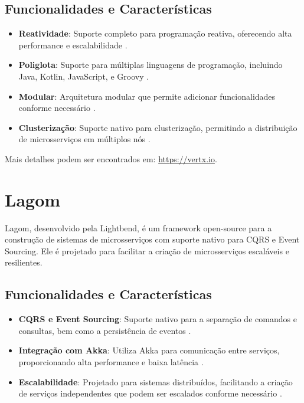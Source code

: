\subsection{Funcionalidades e Características}
\begin{itemize}
    \item \textbf{Reatividade}: Suporte completo para programação reativa, oferecendo alta performance e escalabilidade \cite{Vertx2021}.
    \item \textbf{Poliglota}: Suporte para múltiplas linguagens de programação, incluindo Java, Kotlin, JavaScript, e Groovy \cite{Vertx2021}.
    \item \textbf{Modular}: Arquitetura modular que permite adicionar funcionalidades conforme necessário \cite{Vertx2021}.
    \item \textbf{Clusterização}: Suporte nativo para clusterização, permitindo a distribuição de microsserviços em múltiplos nós \cite{Vertx2021}.
\end{itemize}

Mais detalhes podem ser encontrados em:  \url{https://vertx.io}.


\section{Lagom}
Lagom, desenvolvido pela Lightbend, é um framework open-source para a construção de sistemas de microsserviços com suporte nativo para CQRS e Event Sourcing. Ele é projetado para facilitar a criação de microsserviços escaláveis e resilientes.

\subsection{Funcionalidades e Características}
\begin{itemize}
    \item \textbf{CQRS e Event Sourcing}: Suporte nativo para a separação de comandos e consultas, bem como a persistência de eventos \cite{Lagom2021}.
    \item \textbf{Integração com Akka}: Utiliza Akka para comunicação entre serviços, proporcionando alta performance e baixa latência \cite{Boner2014}.
    \item \textbf{Escalabilidade}: Projetado para sistemas distribuídos, facilitando a criação de serviços independentes que podem ser escalados conforme necessário \cite{Lagom2021}.
\end{itemize}

